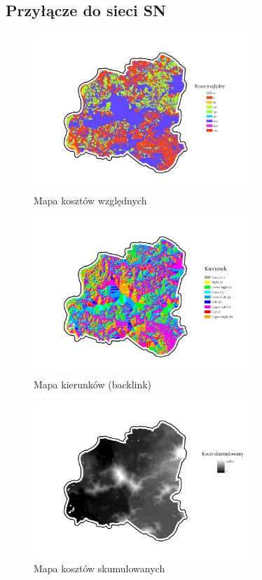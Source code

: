 \documentclass{article}
\begin{document}
\subsection{Przyłącze do sieci SN}
\begin{figure}[H]
    \centering
    \includegraphics[width=0.75\textwidth]{img/plesna-cost-raster.jpg}
    \caption{Mapa kosztów względnych}
\end{figure}

\begin{figure}[H]
    \centering
    \includegraphics[width=0.75\textwidth]{img/plesna-cost-backlink.jpg}
    \caption{Mapa kierunków (backlink)}
\end{figure}

\begin{figure}[H]
    \centering
    \includegraphics[width=0.75\textwidth]{img/plesna-cost-distance.jpg}
    \caption{Mapa kosztów skumulowanych}
\end{figure}
\end{document}

